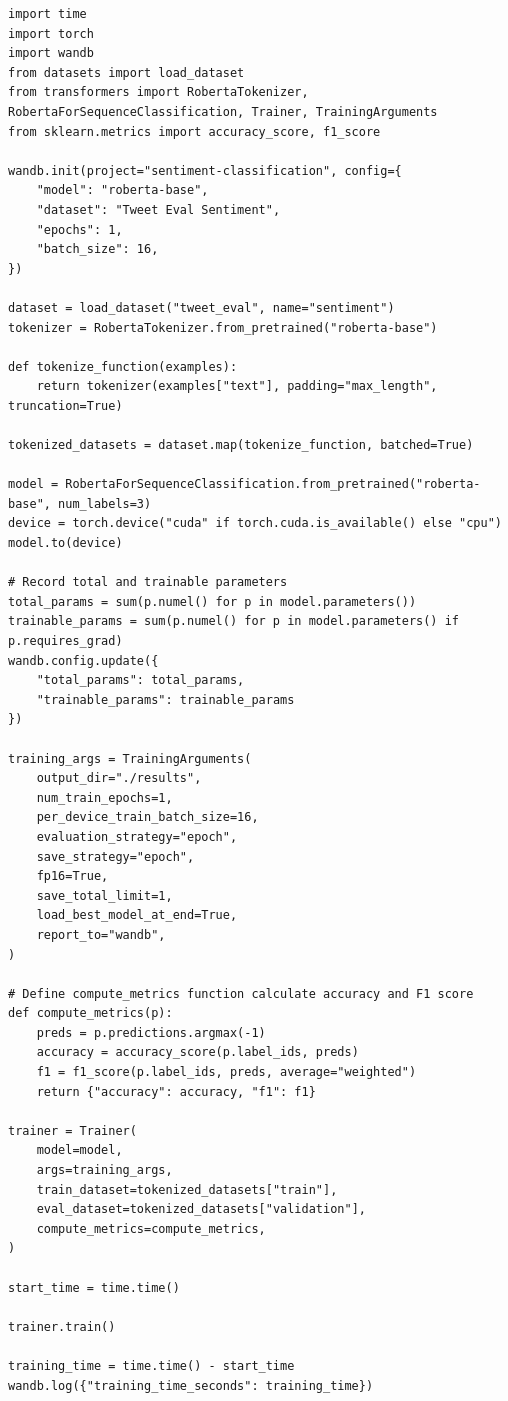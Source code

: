 \documentclass[11pt, oneside]{article}   	%
\begin{document}
\begin{verbatim}
import time
import torch
import wandb
from datasets import load_dataset
from transformers import RobertaTokenizer, RobertaForSequenceClassification, Trainer, TrainingArguments
from sklearn.metrics import accuracy_score, f1_score

wandb.init(project="sentiment-classification", config={
    "model": "roberta-base",
    "dataset": "Tweet Eval Sentiment",
    "epochs": 1,
    "batch_size": 16,
})

dataset = load_dataset("tweet_eval", name="sentiment")
tokenizer = RobertaTokenizer.from_pretrained("roberta-base")

def tokenize_function(examples):
    return tokenizer(examples["text"], padding="max_length", truncation=True)

tokenized_datasets = dataset.map(tokenize_function, batched=True)

model = RobertaForSequenceClassification.from_pretrained("roberta-base", num_labels=3)
device = torch.device("cuda" if torch.cuda.is_available() else "cpu")
model.to(device)

# Record total and trainable parameters
total_params = sum(p.numel() for p in model.parameters())
trainable_params = sum(p.numel() for p in model.parameters() if p.requires_grad)
wandb.config.update({
    "total_params": total_params,
    "trainable_params": trainable_params
})

training_args = TrainingArguments(
    output_dir="./results",
    num_train_epochs=1,
    per_device_train_batch_size=16,
    evaluation_strategy="epoch",
    save_strategy="epoch",
    fp16=True, 
    save_total_limit=1,
    load_best_model_at_end=True,
    report_to="wandb",
)

# Define compute_metrics function calculate accuracy and F1 score
def compute_metrics(p):
    preds = p.predictions.argmax(-1)
    accuracy = accuracy_score(p.label_ids, preds)
    f1 = f1_score(p.label_ids, preds, average="weighted")
    return {"accuracy": accuracy, "f1": f1}

trainer = Trainer(
    model=model,
    args=training_args,
    train_dataset=tokenized_datasets["train"],
    eval_dataset=tokenized_datasets["validation"],
    compute_metrics=compute_metrics,
)

start_time = time.time()

trainer.train()

training_time = time.time() - start_time
wandb.log({"training_time_seconds": training_time})


\end{verbatim}
\end{document}
